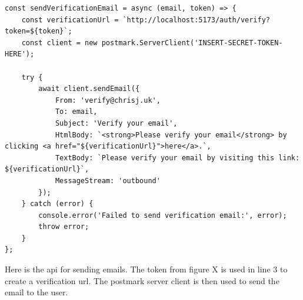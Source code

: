 \begin{minipage}[t]{0.47\textwidth} %
\begin{verbatim}
const sendVerificationEmail = async (email, token) => {
	const verificationUrl = `http://localhost:5173/auth/verify?token=${token}`;
	const client = new postmark.ServerClient('INSERT-SECRET-TOKEN-HERE');
	
	try {
		await client.sendEmail({
			From: 'verify@chrisj.uk',
			To: email,
			Subject: 'Verify your email',
			HtmlBody: `<strong>Please verify your email</strong> by clicking <a href="${verificationUrl}">here</a>.`,
			TextBody: `Please verify your email by visiting this link: ${verificationUrl}`,
			MessageStream: 'outbound'
		});
	} catch (error) {
		console.error('Failed to send verification email:', error);
		throw error;
	}
};
\end{verbatim}
\end{minipage}
\hfill
\begin{minipage}[t]{0.47\textwidth} %
    \vspace{0.5em}
    Here is the api for sending emails. The token from figure X is used in line 3 to create a verification url. The postmark server client is then used to send the email to the user.
\end{minipage}

\vspace{2em}

